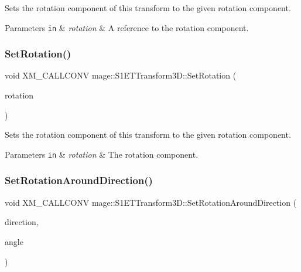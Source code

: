 Sets the rotation component of this transform to the given rotation component.


\begin{DoxyParams}[1]{Parameters}
\mbox{\tt in}  & {\em rotation} & A reference to the rotation component. \\
\hline
\end{DoxyParams}
\mbox{\label{classmage_1_1_s1_e_t_transform3_d_a3c0bc76b1622a5565823139853dea9a5}} 
\subsubsection{\texorpdfstring{Set\+Rotation()}{SetRotation()}\hspace{0.1cm}{\footnotesize\ttfamily [3/3]}}
{\footnotesize\ttfamily void X\+M\+\_\+\+C\+A\+L\+L\+C\+O\+NV mage\+::\+S1\+E\+T\+Transform3\+D\+::\+Set\+Rotation (\begin{DoxyParamCaption}\item[{F\+X\+M\+V\+E\+C\+T\+OR}]{rotation }\end{DoxyParamCaption})\hspace{0.3cm}{\ttfamily [noexcept]}}

Sets the rotation component of this transform to the given rotation component.


\begin{DoxyParams}[1]{Parameters}
\mbox{\tt in}  & {\em rotation} & The rotation component. \\
\hline
\end{DoxyParams}
\mbox{\label{classmage_1_1_s1_e_t_transform3_d_a6d3022e5d79fe1e202c9361c174c0f1b}} 
\subsubsection{\texorpdfstring{Set\+Rotation\+Around\+Direction()}{SetRotationAroundDirection()}}
{\footnotesize\ttfamily void X\+M\+\_\+\+C\+A\+L\+L\+C\+O\+NV mage\+::\+S1\+E\+T\+Transform3\+D\+::\+Set\+Rotation\+Around\+Direction (\begin{DoxyParamCaption}\item[{F\+X\+M\+V\+E\+C\+T\+OR}]{direction,  }\item[{\mbox{\hyperlink{namespacemage_aa97e833b45f06d60a0a9c4fc22ae02c0}{F32}}}]{angle }\end{DoxyParamCaption})\hspace{0.3cm}{\ttfamily [noexcept]}}


